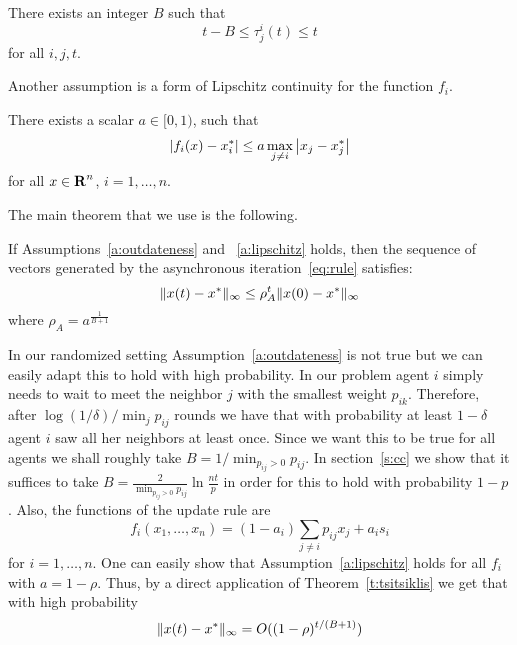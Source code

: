 \begin{assumption}\label{a:outdateness}
There exists an integer $B$ such that 
\[
t-B \leq \tau_j^i(t) \leq t
\]
for all $i,j,t$.
\end{assumption}
Another assumption is a form of Lipschitz continuity for the function $f_i$.
\begin{assumption}\label{a:lipschitz}
There exists a scalar $a \in [0,1)$, such that 
\[
\left|f_i(x) - x_i^*\right| \leq a \max_{j \neq i}\left|x_j - x_j^*\right|
\]
for all $x \in \bm{\mathrm{R}}^n$, $i = 1,\ldots, n$.
\end{assumption}
The main theorem that we use is the following. 
\begin{theorem}[{{\cite{BT97}}}]\label{t:tsitsiklis}
If Assumptions~\ref{a:outdateness} and ~\ref{a:lipschitz} holds, then the sequence of vectors generated 
by the asynchronous iteration~\ref{eq:rule} satisfies:
\[
\| x(t) - x^* \|_{\infty} \leq \rho_A^t\| x(0) - x^* \|_{\infty}
\]
where $\rho_A = a^{\frac{1}{B+1}}$
\end{theorem}
In our randomized setting Assumption~\ref{a:outdateness} is not true 
but we can easily adapt this to
hold with high probability. In our problem
agent $i$ simply needs to wait to meet the neighbor $j$ with the smallest
weight $p_{ik}$. Therefore, after $\log(1/\delta)/\min_{j} p_{ij}$ rounds
we have that with probability at least $1-\delta$ agent $i$ saw all her
neighbors at least once.  Since we want this to be true for all agents
we shall roughly take $B = 1/\min_{p_{ij} > 0} {p_{ij}}$.
In section~\ref{s:cc} we show that it suffices to take 
$B = \frac{2}{\min_{p_{ij} > 0} {p_{ij}}}\ln\frac{nt}{p}$
in order for this to hold with probability $1-p$.
Also, the functions of the update rule are
\[
f_i(x_1,\ldots,x_n) = (1-a_i)\sum_{j \neq i} p_{ij} x_j + a_i s_i
\] 
for $i = 1,\ldots,n$.
One can easily show that Assumption~\ref{a:lipschitz} holds for all $f_i$
with $a = 1 - \rho$. 
Thus, by a direct application of Theorem~\ref{t:tsitsiklis} 
we get that with high probability
\[
  \| x(t) - x^* \|_{\infty} = O((1-\rho)^{t/(B+1)})
\]


